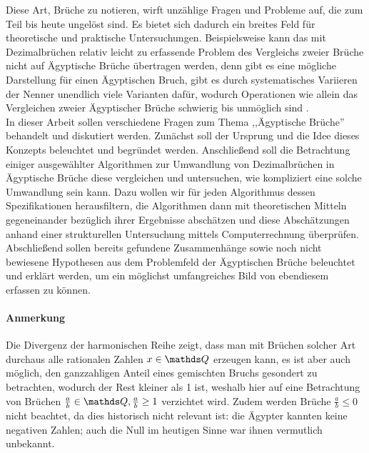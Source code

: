 Diese Art, Brüche zu notieren, wirft unzählige Fragen und Probleme auf, die zum Teil bis heute ungelöst sind. Es bietet sich dadurch ein breites Feld für theoretische und praktische Untersuchungen. Beispielsweise kann das mit Dezimalbrüchen relativ leicht zu erfassende Problem des Vergleichs zweier Brüche nicht auf Ägyptische Brüche übertragen werden, denn gibt es eine mögliche Darstellung für einen Ägyptischen Bruch, gibt es durch systematisches Variieren der Nenner unendlich viele Varianten dafür, wodurch Operationen wie allein das Vergleichen zweier Ägyptischer Brüche schwierig bis unmöglich sind \cite[S. 62]{Resnikoff1984}.\\
In dieser Arbeit sollen verschiedene Fragen zum Thema ,,Ägyptische Brüche'' behandelt und diskutiert werden. Zunächst soll der Ursprung und die Idee dieses Konzepts beleuchtet und begründet werden. Anschließend soll die Betrachtung einiger ausgewählter Algorithmen zur Umwandlung von Dezimalbrüchen in Ägyptische Brüche diese vergleichen und untersuchen, wie kompliziert eine solche Umwandlung sein kann. Dazu wollen wir für jeden Algorithmus dessen Spezifikationen herausfiltern, die Algorithmen dann mit theoretischen Mitteln gegeneinander bezüglich ihrer Ergebnisse abschätzen und diese Abschätzungen anhand einer strukturellen Untersuchung mittels Computerrechnung überprüfen. Abschließend sollen bereits gefundene Zusammenhänge sowie noch nicht bewiesene Hypothesen aus dem Problemfeld der Ägyptischen Brüche beleuchtet und erklärt werden, um ein möglichst umfangreiches Bild von ebendiesem erfassen zu können.\\
\paragraph{Anmerkung}Die Divergenz der harmonischen Reihe zeigt, dass man mit Brüchen solcher Art durchaus alle rationalen Zahlen $x \in \Q$ erzeugen kann, es ist aber auch möglich, den ganzzahligen Anteil eines gemischten Bruchs gesondert zu betrachten, wodurch der Rest kleiner als 1 ist, weshalb hier auf eine Betrachtung von Brüchen $\frac{a}{b}\in \Q, \frac{a}{b} \geq 1$ verzichtet wird. Zudem werden Brüche $\frac{a}{b} \leq 0$ nicht beachtet, da dies historisch nicht relevant ist: die Ägypter kannten keine negativen Zahlen; auch die Null im heutigen Sinne war ihnen vermutlich unbekannt. \cite[S. 37]{George2008}